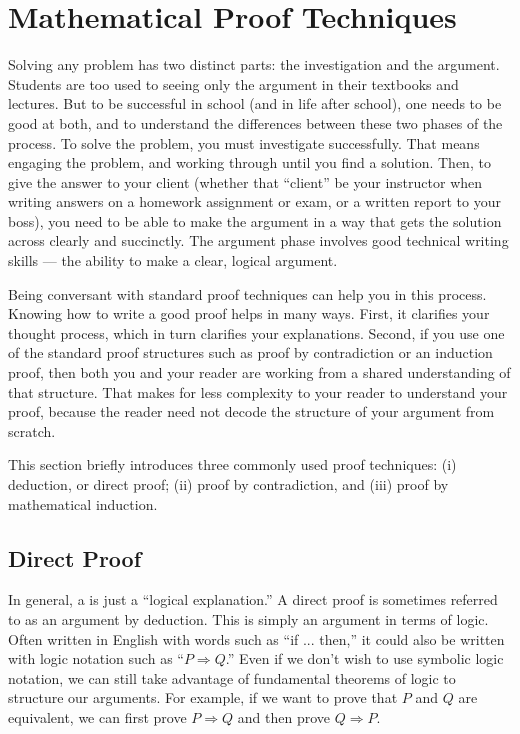\section{Mathematical Proof Techniques}
\label{ProofTechnique}

Solving any problem has two distinct parts:
the investigation and the argument.
Students are too used to seeing only the argument in their textbooks
and lectures.
But to be successful in school (and in life after school),
one needs to be good at both, and to understand the differences
between these two phases of the process.
To solve the problem, you must investigate successfully.
That means engaging the problem, and working through until you find a
solution.
Then, to give the answer to your client (whether that ``client'' be
your instructor when writing answers on a homework assignment or exam,
or a written report to your boss),
you need to be able to make the argument in a way
that gets the solution across clearly and succinctly.
The argument phase involves good technical writing skills ---
the ability to make a clear, logical argument.

Being conversant with standard proof techniques can help you in this
process.
Knowing how to write a good proof helps in many ways.
First, it clarifies your thought process, which in turn clarifies your
explanations.
Second, if you use one of the standard proof structures such as proof
by contradiction or an induction proof, then both you and your reader
are working from a shared understanding of that structure.
That makes for less complexity to your reader to understand your
proof, because the reader need not decode the structure of your
argument from scratch.

This section briefly introduces three commonly used proof techniques:
(i) deduction, or direct proof;
(ii) proof by contradiction, and
(iii) proof by mathematical induction.

\subsection{Direct Proof}

In general, a  is just a ``logical explanation.''
A direct proof is sometimes referred to as an argument by deduction.
This is simply an argument in terms of logic.
Often written in English with words such as ``if ... then,'' it could
also be written with logic notation such as ``\(P \Rightarrow Q\).''
Even if we don't wish to use symbolic logic notation, we can still
take advantage of fundamental theorems of logic to structure our
arguments.
For example, if we want to prove that \(P\) and \(Q\) are equivalent, we
can first prove \(P \Rightarrow Q\) and then prove \(Q \Rightarrow P\).


